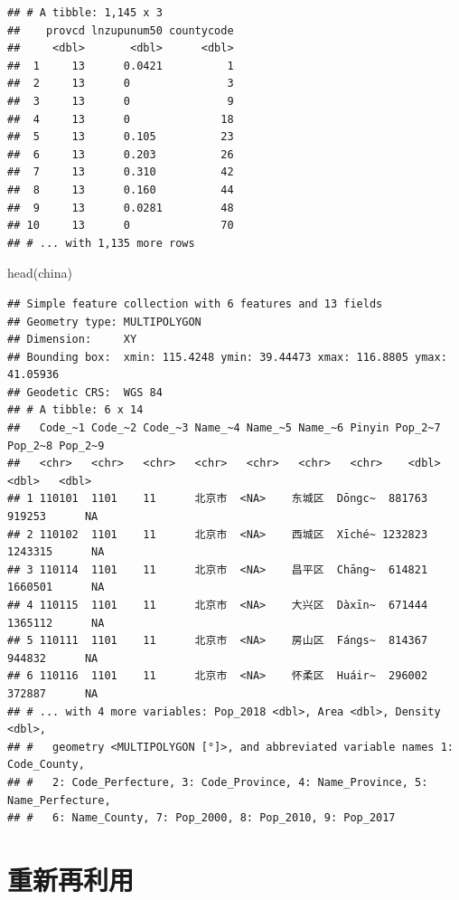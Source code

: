 \documentclass[
  oneside]{book}
\newenvironment{Shaded}{\begin{snugshade}}{\end{snugshade}}
\newcommand{\FunctionTok}[1]{\textcolor[rgb]{0.00,0.00,0.00}{#1}}
\newcommand{\NormalTok}[1]{#1}
\begin{document}
\begin{verbatim}
## # A tibble: 1,145 x 3
##    provcd lnzupunum50 countycode
##     <dbl>       <dbl>      <dbl>
##  1     13      0.0421          1
##  2     13      0               3
##  3     13      0               9
##  4     13      0              18
##  5     13      0.105          23
##  6     13      0.203          26
##  7     13      0.310          42
##  8     13      0.160          44
##  9     13      0.0281         48
## 10     13      0              70
## # ... with 1,135 more rows
\end{verbatim}

\begin{Shaded}
\begin{Highlighting}[]
\FunctionTok{head}\NormalTok{(china)}
\end{Highlighting}
\end{Shaded}

\begin{verbatim}
## Simple feature collection with 6 features and 13 fields
## Geometry type: MULTIPOLYGON
## Dimension:     XY
## Bounding box:  xmin: 115.4248 ymin: 39.44473 xmax: 116.8805 ymax: 41.05936
## Geodetic CRS:  WGS 84
## # A tibble: 6 x 14
##   Code_~1 Code_~2 Code_~3 Name_~4 Name_~5 Name_~6 Pinyin Pop_2~7 Pop_2~8 Pop_2~9
##   <chr>   <chr>   <chr>   <chr>   <chr>   <chr>   <chr>    <dbl>   <dbl>   <dbl>
## 1 110101  1101    11      北京市  <NA>    东城区  Dōngc~  881763  919253      NA
## 2 110102  1101    11      北京市  <NA>    西城区  Xīché~ 1232823 1243315      NA
## 3 110114  1101    11      北京市  <NA>    昌平区  Chāng~  614821 1660501      NA
## 4 110115  1101    11      北京市  <NA>    大兴区  Dàxīn~  671444 1365112      NA
## 5 110111  1101    11      北京市  <NA>    房山区  Fángs~  814367  944832      NA
## 6 110116  1101    11      北京市  <NA>    怀柔区  Huáir~  296002  372887      NA
## # ... with 4 more variables: Pop_2018 <dbl>, Area <dbl>, Density <dbl>,
## #   geometry <MULTIPOLYGON [°]>, and abbreviated variable names 1: Code_County,
## #   2: Code_Perfecture, 3: Code_Province, 4: Name_Province, 5: Name_Perfecture,
## #   6: Name_County, 7: Pop_2000, 8: Pop_2010, 9: Pop_2017
\end{verbatim}

\hypertarget{ux91cdux65b0ux518dux5229ux7528}{%
\section{重新再利用}\label{ux91cdux65b0ux518dux5229ux7528}}
\end{document}

